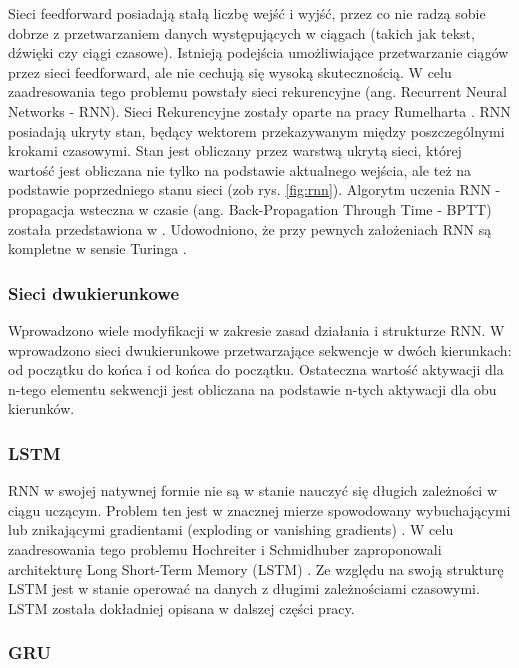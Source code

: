 \documentclass[oneside, mag]{mgr}
\begin{document}
Sieci feedforward posiadają stałą liczbę wejść i wyjść, przez co nie radzą sobie dobrze z przetwarzaniem danych występujących w ciągach (takich jak tekst, dźwięki czy ciągi czasowe). Istnieją podejścia umożliwiające przetwarzanie ciągów przez sieci feedforward, ale nie cechują się wysoką skutecznością. W celu zaadresowania tego problemu powstały sieci rekurencyjne (ang. Recurrent Neural Networks - RNN).
Sieci Rekurencyjne zostały oparte na pracy Rumelharta \cite{RNN}. RNN posiadają ukryty stan, będący wektorem przekazywanym między poszczególnymi krokami czasowymi. Stan jest obliczany przez warstwą ukrytą sieci, której wartość jest obliczana nie tylko na podstawie aktualnego wejścia, ale też na podstawie poprzedniego stanu sieci (zob rys. \ref{fig:rnn}).
Algorytm uczenia RNN - propagacja wsteczna w czasie (ang. Back-Propagation Through Time - BPTT) została przedstawiona w \cite{BPTT}.
Udowodniono, że przy pewnych założeniach RNN są kompletne w sensie Turinga \cite{turing-complete}.

\subsubsection{Sieci dwukierunkowe}

Wprowadzono wiele modyfikacji w zakresie zasad działania i strukturze RNN. 
W \cite{bidirectional} wprowadzono sieci dwukierunkowe przetwarzające sekwencje w dwóch kierunkach: od początku do końca i od końca do początku. Ostateczna wartość aktywacji dla n-tego elementu sekwencji jest obliczana na podstawie n-tych aktywacji dla obu kierunków.

\subsubsection{LSTM}

RNN w swojej natywnej formie nie są w stanie nauczyć się długich zależności w ciągu uczącym. Problem ten jest w znacznej mierze spowodowany wybuchającymi lub znikającymi gradientami (exploding or vanishing gradients) \cite{vanishing_gradient_RNN}. W celu zaadresowania tego problemu Hochreiter i Schmidhuber zaproponowali architekturę Long Short-Term Memory (LSTM) \cite{LSTM}. Ze względu na swoją strukturę LSTM jest w stanie operować na danych z długimi zależnościami czasowymi. LSTM została dokładniej opisana w dalszej części pracy. 

\subsubsection{GRU}
\end{document}
